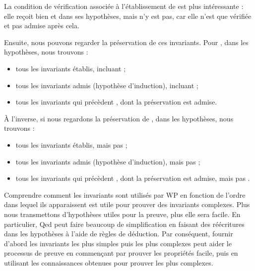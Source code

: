 

La condition de vérification associée à l'établissement de  est
plus intéressante : elle reçoit bien  et  dans
ses hypothèses, mais  n'y est pas, car elle n'est que vérifiée et
pas admise après cela.




Ensuite, nous pouvons regarder la préservation de ces invariants. Pour
, dans les hypothèses, nous trouvons :
\begin{itemize}
  \item tous les invariants établis, incluant  ;
  \item tous les invariants admis (hypothèse d'induction), incluant  ;
  \item tous les invariants qui précèdent , dont la préservation est admise.
\end{itemize}




À l'inverse, si nous regardons la préservation de , dans les
hypothèses, nous trouvons :
\begin{itemize}
  \item tous les invariants établis, mais pas  ;
  \item tous les invariants admis (hypothèse d'induction), mais pas  ;
  \item tous les invariants qui précèdent , dont la préservation
        est admise, mais pas .
\end{itemize}




Comprendre comment les invariants sont utilisés par WP en fonction de l'ordre
dans lequel ils apparaissent est utile pour prouver des invariants complexes.
Plus nous transmettons d'hypothèses utiles pour la preuve, plus elle sera facile.
En particulier, Qed peut faire beaucoup de simplification en faisant des
réécritures dans les hypothèses à l'aide de règles de déduction. Par conséquent,
fournir d'abord les invariants les plus simples puis les plus complexes peut
aider le processus de preuve en commençant par prouver les propriétés facile,
puis en utilisant les connaissances obtenues pour prouver les plus complexes.




